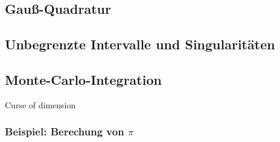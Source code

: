 \subsection{Gauß-Quadratur}

\subsection{Unbegrenzte Intervalle und Singularitäten}

\subsection{Monte-Carlo-Integration}
Curse of dimension

\subsubsection{Beispiel: Berechung von $\pi$}



